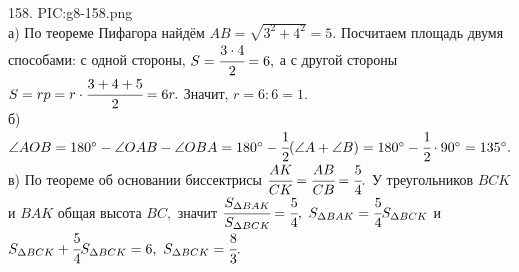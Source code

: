 158. {{PIC:g8-158.png}}\\
а) По теореме Пифагора найдём $AB=\sqrt{3^2+4^2}=5.$ Посчитаем площадь двумя способами: с одной стороны, $S=\cfrac{3\cdot4}{2}=6,$ а с другой стороны $S=rp=r\cdot\cfrac{3+4+5}{2}=6r.$ Значит, $r=6:6=1.$\\
б) $\angle AOB=180^\circ-\angle OAB-\angle OBA=180^\circ-\cfrac{1}{2}(\angle A+\angle B)=180^\circ-\cfrac{1}{2}\cdot90^\circ=135^\circ.$\\
в) По теореме об основании биссектрисы $\cfrac{AK}{CK}=\cfrac{AB}{CB}=\cfrac{5}{4}.$ У треугольников $BCK$ и $BAK$ общая высота $BC,$ значит $\cfrac{S_{\Delta BAK}}{S_{\Delta BCK}}=\cfrac{5}{4},\ S_{\Delta BAK}=\cfrac{5}{4}S_{\Delta BCK}$ и $S_{\Delta BCK}+\cfrac{5}{4}S_{\Delta BCK}=6,\ S_{\Delta BCK}=\cfrac{8}{3}.$\newpage\noindent
